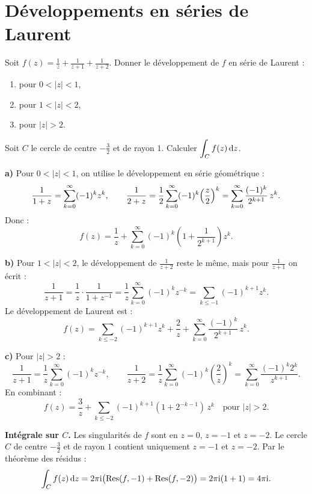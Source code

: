 \documentclass[12pt,a4paper]{article}
\begin{document}
\section{Développements en séries de Laurent}

\begin{boiteexercice}
\niveau{\moyen}
Soit $\displaystyle f(z) = \frac{1}{z} + \frac{1}{z+1} + \frac{1}{z+2}$. Donner le développement de $f$ en série de Laurent :
\begin{enumerate}[label=\alph*)]
  \item pour $0 < |z| < 1$,
  \item pour $1 < |z| < 2$,
  \item pour $|z| > 2$.
\end{enumerate}
Soit $C$ le cercle de centre $-\tfrac{3}{2}$ et de rayon $1$. Calculer $\displaystyle\int_C f(z)\,\mathrm{d} z$.
\end{boiteexercice}

\begin{boitecorrige}

\textbf{a)} Pour $0 < |z| < 1$, on utilise le développement en série géométrique :
\[
\frac{1}{1+z} = \sum_{k=0}^{\infty}(-1)^k z^k, \qquad
\frac{1}{2+z} = \frac{1}{2}\sum_{k=0}^{\infty}(-1)^k\Bigl(\frac{z}{2}\Bigr)^k = \sum_{k=0}^{\infty}\frac{(-1)^k}{2^{k+1}}\,z^k.
\]
Donc :
\[
\boxed{f(z) = \frac{1}{z} + \sum_{k=0}^{\infty}(-1)^k\!\left(1+\frac{1}{2^{k+1}}\right)z^k.}
\]

\textbf{b)} Pour $1 < |z| < 2$, le développement de $\tfrac{1}{z+2}$ reste le même, mais pour $\tfrac{1}{z+1}$ on écrit :
\[
\frac{1}{z+1} = \frac{1}{z}\cdot\frac{1}{1+z^{-1}} = \frac{1}{z}\sum_{k=0}^{\infty}(-1)^k z^{-k} = \sum_{k\leq -1}(-1)^{k+1}z^k.
\]
Le développement de Laurent est :
\[
\boxed{f(z) = \sum_{k\leq -2}(-1)^{k+1}z^k + \frac{2}{z} + \sum_{k=0}^{\infty}\frac{(-1)^k}{2^{k+1}}\,z^k.}
\]

\textbf{c)} Pour $|z| > 2$ :
\[
\frac{1}{z+1} = \frac{1}{z}\sum_{k=0}^{\infty}(-1)^k z^{-k}, \qquad
\frac{1}{z+2} = \frac{1}{z}\sum_{k=0}^{\infty}(-1)^k\!\left(\frac{2}{z}\right)^k = \sum_{k=0}^{\infty}\frac{(-1)^k 2^k}{z^{k+1}}.
\]
En combinant :
\[
\boxed{f(z) = \frac{3}{z} + \sum_{k\leq -2}(-1)^{k+1}(1+2^{-k-1})\,z^k \quad\text{pour }|z|>2.}
\]

\textbf{Intégrale sur $C$.} Les singularités de $f$ sont en $z = 0$, $z = -1$ et $z = -2$. Le cercle $C$ de centre $-\tfrac{3}{2}$ et de rayon $1$ contient uniquement $z = -1$ et $z = -2$. Par le théorème des résidus :
\[
\int_C f(z)\,\mathrm{d} z = 2\pi\mathrm{i}\bigl(\operatorname{Res}(f,-1) + \operatorname{Res}(f,-2)\bigr) = 2\pi\mathrm{i}(1+1) = 4\pi\mathrm{i}.
\]
\end{boitecorrige}
\end{document}
